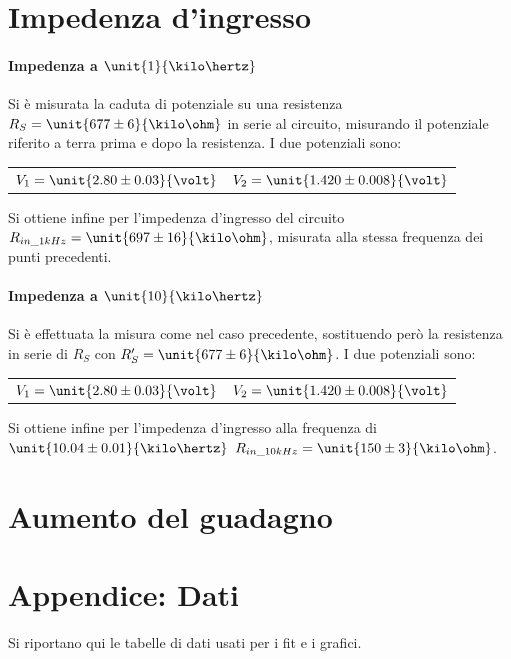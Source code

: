 \documentclass[10pt,a4paper]{article}
\begin{document}
\section{Impedenza d'ingresso}

\paragraph{Impedenza a $\unit{1}{\kilo\hertz}$} Si è misurata la caduta di potenziale su una resistenza $R_S = \unit{677 \pm 6}{\kilo\ohm}$ in serie al circuito, misurando il potenziale riferito a terra prima e dopo la resistenza.
I due potenziali sono:
\begin{table}[h!]
	\centering
	\begin{tabular}{cc}
		$V_1 = \unit{2.80 \pm 0.03}{\volt}$  & $V_2 = \unit{1.420 \pm 0.008}{\volt}$
	\end{tabular}
\end{table}

Si ottiene infine per l'impedenza d'ingresso del circuito $R_{in\_ 1kHz} = \unit{697 \pm 16}{\kilo\ohm}$, misurata alla stessa frequenza dei punti precedenti.

\paragraph{Impedenza a $\unit{10}{\kilo\hertz}$}  Si è effettuata la misura come nel caso precedente, sostituendo però la resistenza in serie di $R_S$ con $R_S' = \unit{677 \pm 6}{\kilo\ohm}$.
I due potenziali sono:
\begin{table}[h!]
	\centering
	\begin{tabular}{cc}
		$V_1 = \unit{2.80 \pm 0.03}{\volt}$  & $V_2 = \unit{1.420 \pm 0.008}{\volt}$
	\end{tabular}
\end{table}

Si ottiene infine per l'impedenza d'ingresso alla frequenza di $\unit{10.04 \pm 0.01}{\kilo\hertz}$ $R_{in\_ 10kHz} = \unit{150 \pm 3}{\kilo\ohm}$.

\section{Aumento del guadagno}

\pagebreak
\section{Appendice: Dati}
Si riportano qui le tabelle di dati usati per i fit e i grafici.

\begin{figure}[h]
	\centering
	\begin{minipage}[c]{0.4\textwidth}
		\centering
		
		\label{njfet}
	\end{minipage}
	\begin{minipage}[c]{0.4\textwidth}
		\centering
		\label{}
	\end{minipage}
\end{figure}
\end{document}
